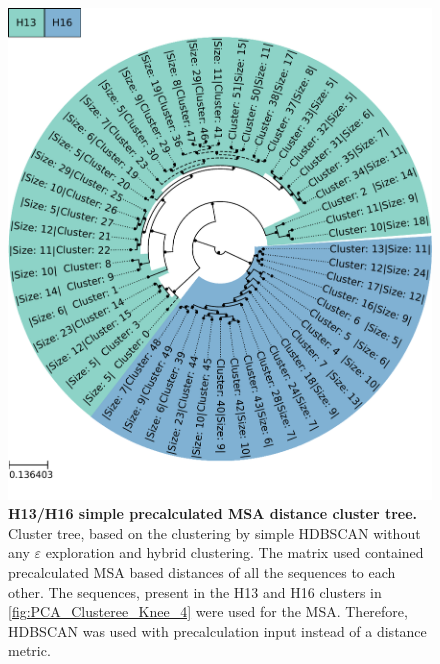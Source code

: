 \begin{figure}[!hbt]
    \centering
    \includegraphics[width=\textwidth]{PCA/Clustertree_Segment_4_H_Focus.pdf}
    \caption[H13/H16 simple precalculated \gls{MSA} distance cluster tree]{\textbf{H13/H16 simple precalculated \gls{MSA} distance cluster tree.} Cluster tree, based on the clustering by simple \gls{HDBSCAN} without any $\varepsilon$ exploration and hybrid clustering. The matrix used contained precalculated \gls{MSA} based distances of all the sequences to each other. The sequences, present in the H13 and H16 clusters in \autoref{fig:PCA_Clusteree_Knee_4} were used for the \gls{MSA}. Therefore, \gls{HDBSCAN} was used with precalculation input instead of a distance metric.}
    \label{fig:Simple_Clustertree_MSA}
\end{figure}

